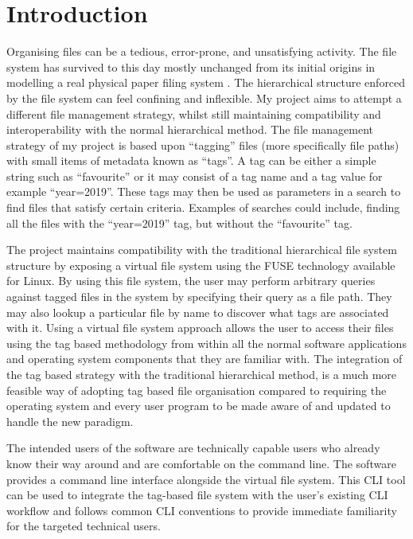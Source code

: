\chapter{Introduction}
\vspace{1cm}

Organising files can be a tedious, error-prone, and unsatisfying activity. The
file system has survived to this day mostly unchanged from its initial origins
in modelling a real physical paper filing system . The
hierarchical structure enforced by the file system can feel confining and
inflexible. My project aims to attempt a different file management strategy,
whilst still maintaining compatibility and interoperability with the normal
hierarchical method. The file management strategy of my project is based upon
``tagging'' files (more specifically file paths) with small items of metadata
known as ``tags''. A tag can be either a simple string such as ``favourite'' or
it may consist of a tag name and a tag value for example ``year=2019''. These
tags may then be used as parameters in a search to find files that satisfy
certain criteria. Examples of searches could include, finding all the files
with the ``year=2019'' tag, but without the ``favourite'' tag.

The project maintains compatibility with the traditional hierarchical file
system structure by exposing a virtual file system using the FUSE technology
available for Linux. By using this file system, the user may perform arbitrary
queries against tagged files in the system by specifying their query as a file
path. They may also lookup a particular file by name to discover what tags are
associated with it. Using a virtual file system approach allows the user to
access their files using the tag based methodology from within all the normal
software applications and operating system components that they are familiar
with. The integration of the tag based strategy with the traditional
hierarchical method, is a much more feasible way of adopting tag based file
organisation compared to requiring the operating system and every user program
to be made aware of and updated to handle the new paradigm.

The intended users of the software are technically capable users who already
know their way around and are comfortable on the command line. The software
provides a command line interface alongside the virtual file system. This CLI
tool can be used to integrate the tag-based file system with the user's
existing CLI workflow and follows common CLI conventions to provide immediate
familiarity for the targeted technical users.

